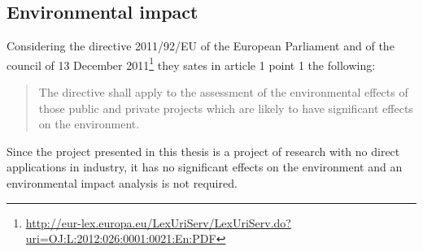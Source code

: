 \subsection*{Environmental impact}
Considering the directive 2011/92/EU of the European Parliament and of the council of 13 December 2011\footnote{\href{http://eur-lex.europa.eu/LexUriServ/LexUriServ.do?uri=OJ:L:2012:026:0001:0021:En:PDF}{\url{http://eur-lex.europa.eu/LexUriServ/LexUriServ.do?uri=OJ:L:2012:026:0001:0021:En:PDF}}}
they sates in article 1 point 1 the following:
\begin{quote}
The directive shall apply to the assessment of the environmental effects of those public and private projects which are likely to have significant effects on the environment.
\end{quote}
Since the project presented in this thesis is a project of research with no direct applications in industry, it has no significant effects on the environment and an environmental impact analysis is not required.


 